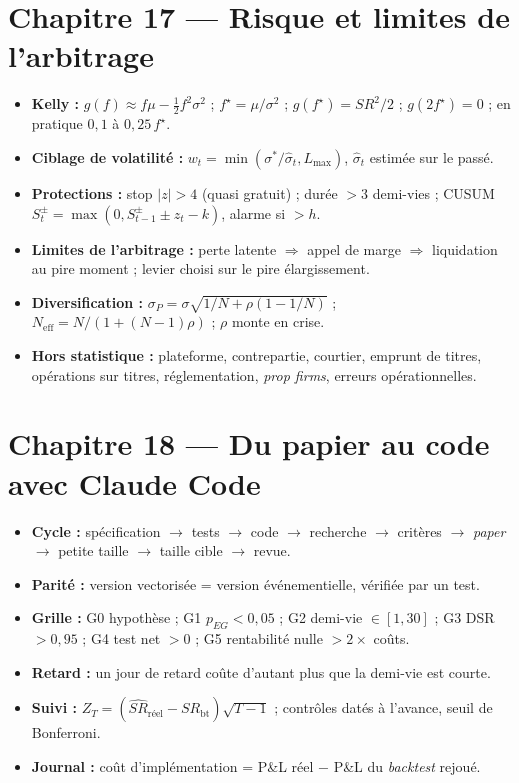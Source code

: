 \section*{Chapitre 17 — Risque et limites de l'arbitrage}
\begin{itemize}[leftmargin=1.2em,itemsep=0.05em]
\item \textbf{Kelly :} $g(f) \approx f\mu - \tfrac12 f^2\sigma^2$ ; $f^\star = \mu/\sigma^2$ ; $g(f^\star) = SR^2/2$ ; $g(2f^\star) = 0$ ; en pratique $0{,}1$ à $0{,}25\,f^\star$.
\item \textbf{Ciblage de volatilité :} $w_t = \min(\sigma^\ast/\hat\sigma_t, L_{\max})$, $\hat\sigma_t$ estimée sur le passé.
\item \textbf{Protections :} stop $|z|>4$ (quasi gratuit) ; durée $> 3$ demi-vies ; CUSUM $S^\pm_t = \max(0, S^\pm_{t-1} \pm z_t - k)$, alarme si $> h$.
\item \textbf{Limites de l'arbitrage :} perte latente $\Rightarrow$ appel de marge $\Rightarrow$ liquidation au pire moment ; levier choisi sur le pire élargissement.
\item \textbf{Diversification :} $\sigma_P = \sigma\sqrt{1/N + \rho(1-1/N)}$ ; $N_{\text{eff}} = N/(1+(N-1)\rho)$ ; $\rho$ monte en crise.
\item \textbf{Hors statistique :} plateforme, contrepartie, courtier, emprunt de titres, opérations sur titres, réglementation, \emph{prop firms}, erreurs opérationnelles.
\end{itemize}

\section*{Chapitre 18 — Du papier au code avec Claude Code}
\begin{itemize}[leftmargin=1.2em,itemsep=0.05em]
\item \textbf{Cycle :} spécification $\to$ tests $\to$ code $\to$ recherche $\to$ critères $\to$ \emph{paper} $\to$ petite taille $\to$ taille cible $\to$ revue.
\item \textbf{Parité :} version vectorisée = version événementielle, vérifiée par un test.
\item \textbf{Grille :} G0 hypothèse ; G1 $p_{EG}<0{,}05$ ; G2 demi-vie $\in[1,30]$ ; G3 DSR $>0{,}95$ ; G4 test net $>0$ ; G5 rentabilité nulle $> 2\times$ coûts.
\item \textbf{Retard :} un jour de retard coûte d'autant plus que la demi-vie est courte.
\item \textbf{Suivi :} $Z_T = (\widehat{SR}_{\text{réel}} - SR_{\text{bt}})\sqrt{T-1}$ ; contrôles datés à l'avance, seuil de Bonferroni.
\item \textbf{Journal :} coût d'implémentation = P\&L réel $-$ P\&L du \emph{backtest} rejoué.
\end{itemize}
